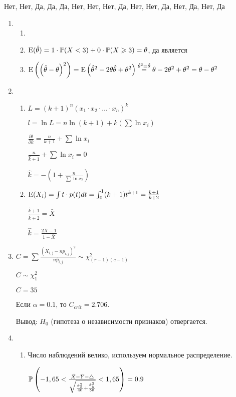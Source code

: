 Нет, Нет, Да, Да, Да, Нет, Нет, Нет, Да, Нет, Нет, Да, Нет, Да, Нет, Да



\begin{enumerate}

\item
\begin{enumerate}
\item
\item $\E(\hat{\theta})=1\cdot \P(X<3)+0\cdot \P(X \ge 3)=\theta$, да является
\item $\E\left(\left(\hat{\theta }-\theta \right)^{2} \right)=\E\left(\hat{\theta}^{2}-2\theta\hat{\theta}+\theta^{2}\right) \stackrel{\hat{\theta}^{2}=\hat{\theta}}{=} \theta-2\theta^{2}+\theta^{2}=\theta-\theta^{2}$
\end{enumerate}
\item
\begin{enumerate}
\item  $L=(k+1)^{n}(x_{1}\cdot x_{2} \cdot \ldots \cdot x_{n})^{k}$

$l=\ln{L}=n\ln(k+1)+k(\sum \ln{x_{i}})$

$\frac{\partial l}{\partial k}=\frac{n}{k+1}+\sum \ln{x_{i}}$

$\frac{n}{\hat{k}+1}+\sum \ln{x_{i}}=0$

$\hat{k}=-\left(1+\frac{n}{\sum \ln{x_{i}}} \right)$
\item  $\E(X_{i})=\int t\cdot p(t)dt=\int_{0}^{1} (k+1)t^{k+1}=\frac{k+1}{k+2}$

$\frac{\hat{k}+1}{\hat{k}+2}=\bar{X}$

$\hat{k}=\frac{2\bar{X}-1}{1-\bar{X}}$
\end{enumerate}
\item $C=\sum \frac{(X_{i,j}-n \hat{p}_{i,j})^{2}}{n\hat{p}_{i,j}}\sim \chi_{(r-1)(c-1)}^{2}$

$C\sim \chi_{1}^{2}$

$C=35$

Если $\alpha=0.1$, то $C_{crit}=2.706$.

Вывод: $H_{0}$ (гипотеза о независимости признаков) отвергается.
\item
\begin{enumerate}
\item Число наблюдений велико, используем нормальное распределение.

$\P\left(-1,65<\frac{\bar{X}-\bar{Y}-\triangle}{\sqrt{\frac{\hat{\sigma}_{x}^{2}}{40}+\frac{\hat{\sigma}_{y}^{2}}{50}}}<1,65\right)=0.9$


\end{enumerate}
\end{enumerate}
